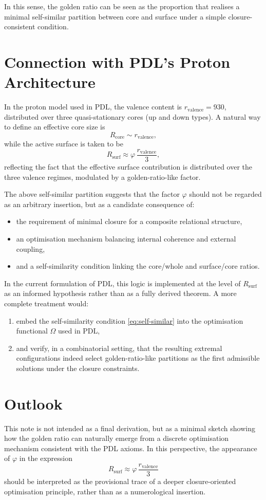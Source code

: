 \documentclass[11pt,a4paper]{article}
\begin{document}
In this sense, the golden ratio can be seen as the proportion that realises a minimal self-similar partition between core and surface under a simple closure-consistent condition.

\section{Connection with PDL's Proton Architecture}

In the proton model used in PDL, the valence content is $r_{\text{valence}} = 930$, distributed over three quasi-stationary cores (up and down types). A natural way to define an effective core size is
\[
R_{\text{core}} \sim r_{\text{valence}},
\]
while the active surface is taken to be
\[
R_{\text{surf}} \approx \varphi \,\frac{r_{\text{valence}}}{3},
\]
reflecting the fact that the effective surface contribution is distributed over the three valence regimes, modulated by a golden-ratio-like factor.

The above self-similar partition suggests that the factor $\varphi$ should not be regarded as an arbitrary insertion, but as a candidate consequence of:
\begin{itemize}
  \item the requirement of minimal closure for a composite relational structure,
  \item an optimisation mechanism balancing internal coherence and external coupling,
  \item and a self-similarity condition linking the core/whole and surface/core ratios.
\end{itemize}

In the current formulation of PDL, this logic is implemented at the level of $R_{\text{surf}}$ as an informed hypothesis rather than as a fully derived theorem. A more complete treatment would:
\begin{enumerate}
  \item embed the self-similarity condition \eqref{eq:self-similar} into the optimisation functional $\Omega$ used in PDL,
  \item and verify, in a combinatorial setting, that the resulting extremal configurations indeed select golden-ratio-like partitions as the first admissible solutions under the closure constraints.
\end{enumerate}

\section{Outlook}

This note is not intended as a final derivation, but as a minimal sketch showing how the golden ratio can naturally emerge from a discrete optimisation mechanism consistent with the PDL axioms. In this perspective, the appearance of $\varphi$ in the expression
\[
R_{\text{surf}} \approx \varphi \,\frac{r_{\text{valence}}}{3}
\]
should be interpreted as the provisional trace of a deeper closure-oriented optimisation principle, rather than as a numerological insertion.
\end{document}
